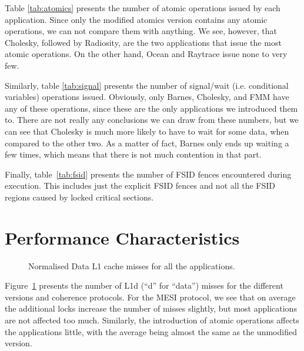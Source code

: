 Table \ref{tab:atomics} presents the number of atomic operations issued by each
application. Since only the modified atomics version contains any atomic
operations, we can not compare them with anything. We see, however, that
Cholesky, followed by Radiosity, are the two applications that issue the most
atomic operations. On the other hand, Ocean and Raytrace issue none to
very few. 

Similarly, table \ref{tab:signal} presents the number of signal/wait (i.e.
conditional variables) operations issued. Obviously, only Barnes, Cholesky, and
FMM have any of these operations, since these are the only applications we
introduced them to. There are not really any conclusions we can draw from these
numbers, but we can see that Cholesky is much more likely to have to wait for
some data, when compared to the other two. As a matter of fact, Barnes only ends
up waiting a few times, which means that there is not much contention in that
part.

Finally, table~\ref{tab:fsid} presents the number of FSID fences encountered
during execution. This includes just the explicit FSID fences and not all the
FSID regions caused by locked critical sections.

\section{Performance Characteristics}
\label{sec:res_perf}

\begin{figure}
	\caption{Normalised Data L1 cache misses for all the applications.}
	\label{fig:res_l1d_misses}
\end{figure}

Figure~\ref{fig:res_l1d_misses} presents the number of L1d (``d'' for ``data'')
misses for the different versions and coherence protocols. For the MESI
protocol, we see that on average the additional locks increase the number of
misses slightly, but most applications are not affected too much. Similarly, the
introduction of atomic operations affects the applications little, with the
average being almost the same as the unmodified version. 

